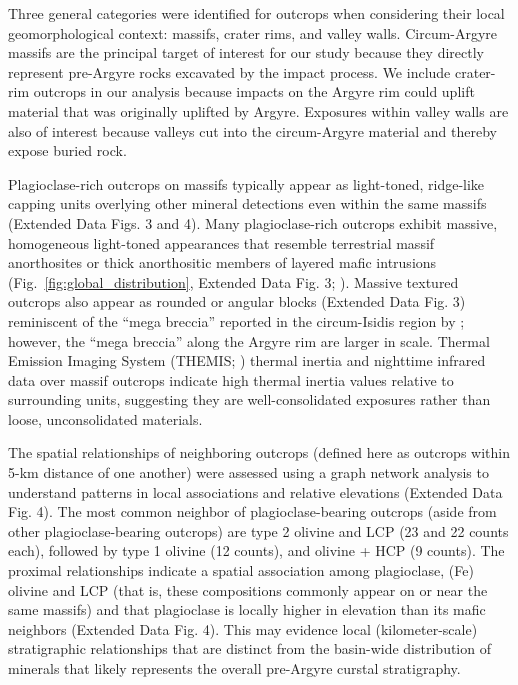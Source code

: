 \documentclass[12pt]{article}
\begin{document}
Three general categories were identified for outcrops when considering their local geomorphological context: massifs, crater rims, and valley walls. Circum-Argyre massifs are the principal target of interest for our study because they directly represent pre-Argyre rocks excavated by the impact process. We include crater-rim outcrops in our analysis because impacts on the Argyre rim could uplift material that was originally uplifted by Argyre. Exposures within valley walls are also of interest because valleys cut into the circum-Argyre material and thereby expose buried rock.

Plagioclase-rich outcrops on massifs typically appear as light-toned, ridge-like capping units overlying other mineral detections even within the same massifs (Extended Data Figs. 3 and 4). Many plagioclase-rich outcrops exhibit massive, homogeneous light-toned appearances that resemble terrestrial massif anorthosites or thick anorthositic members of layered mafic intrusions (Fig.~\ref{fig:global_distribution}, Extended Data Fig. 3; \citealt{Ashwal1993}). Massive textured outcrops also appear as rounded or angular blocks (Extended Data Fig. 3) reminiscent of the ``mega breccia'' reported in the circum-Isidis region by \citet{Scheller2020}; however, the ``mega breccia'' along the Argyre rim are larger in scale. Thermal Emission Imaging System (THEMIS; \citealt{Christensen2004}) thermal inertia \citep{Fergason2006} and nighttime infrared data \citep{Edwards2011} over massif outcrops indicate high thermal inertia values relative to surrounding units, suggesting they are well-consolidated exposures rather than loose, unconsolidated materials.

The spatial relationships of neighboring outcrops (defined here as outcrops within 5-km distance of one another) were assessed using a graph network analysis to understand patterns in local associations and relative elevations (Extended Data Fig. 4). The most common neighbor of plagioclase-bearing outcrops (aside from other plagioclase-bearing outcrops) are type 2 olivine and LCP (23 and 22 counts each), followed by type 1 olivine (12 counts), and olivine + HCP (9 counts). The proximal relationships indicate a spatial association among plagioclase, (Fe) olivine and LCP (that is, these compositions commonly appear on or near the same massifs) and that plagioclase is locally higher in elevation than its mafic neighbors (Extended Data Fig. 4). This may evidence local (kilometer-scale) stratigraphic relationships that are distinct from the basin-wide distribution of minerals that likely represents the overall pre-Argyre curstal stratigraphy.
\end{document}
